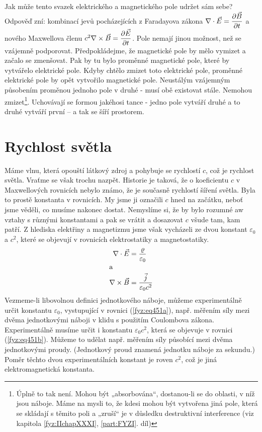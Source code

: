   Jak může tento svazek elektrického a magnetického pole udržet sám sebe? Odpověď zní: kombinací 
  jevů pocházejících z Faradayova zákona \(\nabla\cdot\vec{E} = \dfrac{\partial \vec{B}}{\partial t}\) a nového 
  Maxwellova členu \(c^2\nabla\times\vec{B} =\dfrac{\partial \vec{E}}{\partial t} \). Pole nemají jinou možnost, než 
  se vzájemně podporovat. Předpokládejme, že magnetické pole by mělo vymizet a začalo se zmenšovat. 
  Pak by tu bylo proměnné magnetické pole, které by vytvářelo elektrické pole. Kdyby chtělo zmizet 
  toto elektrické pole, proměnné elektrické pole by opět vytvořilo magnetické pole. Neustálým 
  vzájemným působením proměnou jednoho pole v druhé - musí obě existovat stále. Nemohou 
  zmizet\footnote{ Úplně to tak není. Mohou být „absorbována“, dostanou-li se do oblasti, v níž 
  jsou náboje. Máme na mysli to, že kdesi mohou být vytvořena jiná pole, která se skládají s těmito 
  poli a „zruší“ je v důsledku destruktivní interference (viz kapitola \ref{fyz:IIchapXXXI}, 
  \ref{part:FYZI}. díl)}. Uchovávají se formou jakéhosi tance - jedno pole vytváří druhé a to druhé 
  vytváří první – a tak se šíří prostorem.

\newpage
\section{Rychlost světla}\label{fyz:IIchapXVIIIsecIV}
  Máme vlnu, která opouští látkový zdroj a pohybuje se rychlostí \(c\), což je rychlost světla. 
  Vraťme se však trochu nazpět. Historie je taková, že o koeficientu \(c\) v Maxwellových rovnicích 
  nebylo známo, že je současně rychlostí šíření světla. Byla to prostě konstanta v rovnicích. My 
  jsme ji označili \(c\) hned na začátku, neboť jsme věděli, co musíme nakonec dostat. Nemyslíme 
  si, že by bylo rozumné aw vztahy s různými konstantami a pak se vrátit a dosazovat \(c\) všude 
  tam, kam patří. Z hlediska elektřiny a magnetizmu jsme však vycházeli ze dvou konstant 
  \(\varepsilon_0\) a \(c^2\), které se objevují v rovnicích elektrostatiky a magnetostatiky.
  \begin{subequations}\label{fyz:eq451}
    \begin{align}
      \nabla\cdot\vec{E}  &= \frac{\varrho}{\varepsilon_0}    \label{fyz:eq451a}\\
      \shortintertext{a} 
      \nabla\times\vec{B} &= \frac{\vec{j}}{\varepsilon_0c^2} \label{fyz:eq451b}
    \end{align}
  \end{subequations}
  Vezmeme-li libovolnou definici jednotkového náboje, můžeme experimentálně určit konstantu 
  \(\varepsilon_0\), vystupující v rovnici (\ref{fyz:eq451a}), např. měřením síly mezi dvěma 
  jednotkovými náboji v klidu s použitím Coulombova zákona. Experimentálně musíme určit i konstantu 
  \(\varepsilon_0c^2\), která se objevuje v rovnici (\ref{fyz:eq451b}). Můžeme to udělat např. 
  měřením síly působící mezi dvěma jednotkovými proudy. (Jednotkový proud znamená jednotku náboje 
  za sekundu.) Poměr těchto dvou experimentálních konstant je roven \(c^2\), což je jiná 
  elektromagnetická konstanta. 
 
